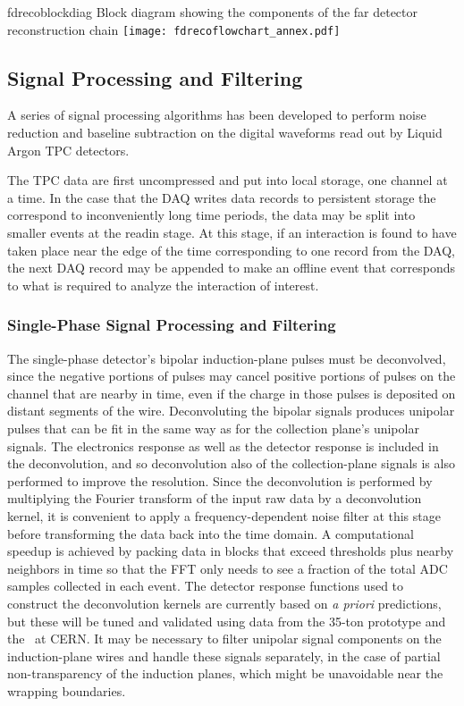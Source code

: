 \begin{cdrfigure}{fdrecoblockdiag}
{Block diagram showing the components of the far detector reconstruction chain}
\texttt{[image: fdrecoflowchart\_annex.pdf]}
\end{cdrfigure}

\subsection{Signal Processing and Filtering}
\label{annex:reconstruction-signal-proc}

A series of signal processing algorithms has been developed to
perform noise reduction and baseline subtraction on the digital
waveforms read out by Liquid Argon TPC detectors. 

The TPC data are first uncompressed and put into local storage, one channel at a time.  
In the case that the DAQ writes data records to persistent
storage the correspond to inconveniently long time periods, the data may be split
into smaller events at the readin stage.  At this stage, if an interaction is found
to have taken place near the edge of the time corresponding to one record from the DAQ,
the next DAQ record may be appended to make an offline event that corresponds to
what is required to analyze the interaction of interest.

\subsubsection{Single-Phase Signal Processing and Filtering}

The single-phase detector's bipolar induction-plane pulses must be deconvolved,
since the negative portions of pulses may cancel positive portions of pulses on the channel
that are nearby in time, even if the charge in those pulses is deposited on distant segments
of the wire.  Deconvoluting the bipolar signals produces unipolar pulses that can be fit in the
same way as for the collection plane's unipolar signals.  
The electronics response as well as the detector response is included in the
deconvolution, and so deconvolution also of the collection-plane signals is also performed to improve
the resolution.   Since the deconvolution is performed by multiplying the Fourier transform of the
input raw data by a deconvolution kernel, it is convenient to apply a frequency-dependent noise filter
at this stage before transforming the data back into the time domain.
A computational speedup is achieved by packing data in
blocks that exceed thresholds plus nearby neighbors in time so that
the FFT only needs to see a fraction of the total ADC samples
collected in each event.
The detector response functions used to construct the deconvolution kernels are currently
based on \textit{a priori} predictions, but these will be tuned and
validated using data from the 35-ton prototype and the~\cernsingleproto{} at CERN.
It may be necessary to filter unipolar signal components on the induction-plane
wires and handle these signals separately, in the case of partial
non-transparency of the induction planes, which might be unavoidable
near the wrapping boundaries.  

